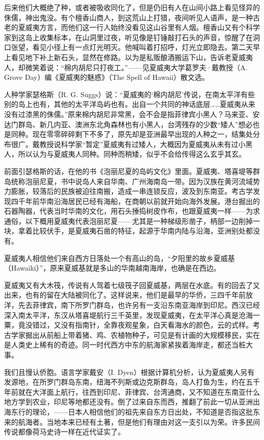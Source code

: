 \par 后来他们大概绝了种，或者被吸收同化了，但是仍旧有人在山间小路上看见怪异的侏儒，神出鬼没。有个檀香山商人，到这荒山上打猎，夜间听见人语声，是一种古老的夏威夷方言，而他们这一行人始终没看见这山谷里有人烟。檀香山又有个科学家到这岛上收集标本，在山洞里过夜，听见像是钉锤敲打石头的声音，惊醒了在洞口张望，看见小径上有一点灯光明灭。他喊叫着打招呼，灯光立即隐去。第二天早上看见地下补上新石头，显然在修路。以为是私贩酿酒搬运下山，告诉老夏威夷人，却微笑着说：“棉内胡尼只打夜工。”——见夏威夷大学葛罗夫·戴教授（A. Grove Day）编《夏威夷的魅惑》（The Spell of Hawaii）散文选。
\par 人种学家瑟格斯（R. G. Suggs）说：“夏威夷的‘棉内胡尼’传说，在南太平洋有些别的岛上也有，其他的太平洋岛屿也有。出自一个共同的神话底层……夏威夷从来没有过漆黑的侏儒。”原来棉内胡尼非常黑，会不会是指菲律宾小黑人？马来亚、安达门群岛、新几内亚、澳洲东北角森林也有小黑人，台湾残存的少数“矮人”想必也是同种。现在零零碎碎剩下不多了，原先却是亚洲最早出现的人种之一，结集处分布很广。戴教授说科学家“暂定”夏威夷有过矮人，大概因为夏威夷从未有过小黑人，所以认为与夏威夷人同种。同种而稍矮，似乎不会给传得这么玄乎其玄。
\par 前面引瑟格斯的话，在他的书《泡丽尼夏的岛屿文化》里面。夏威夷、塔喜堤等群岛统称泡丽尼夏，书中说岛人来自华南、广州海南岛一带。因为汉族在黄河流域势力膨胀，较落后的民族被迫往南搬，造成一串连锁反应，波及到东南亚。考古学发现四千年前华南沿海居民已经有海船，在商朝以前就开始向海外发展。港台掘出的石器陶器，代表当时华南的文化，用石头捶捣树皮作布，也跟夏威夷一样——为求通俗，以下概用夏威夷代表泡丽尼夏——尤其是一种梯级形凿子，柄部一边削掉一块，拿着比较伏手，是夏威夷石凿的特征，起源于华南内陆与沿海，亚洲别处都没有。
\par 夏威夷人相信他们来自西方日落处一个有高山的岛，“夕阳里的故乡夏威基（Hawaiki）”，原来夏威基就是多山的华南越南海岸，也确是在西边。
\par 夏威夷又有大木筏，传说有人驾着七级筏子回夏威基，两层在水底。有的回去了又出来，也有的留在大陆被同化了。这样说来，他们是最早的华侨，三四千年前放洋，先去菲律宾，南下所罗门群岛，也许另有一支沿东南亚海岸到印尼。西汉已经深入南太平洋，东汉从塔喜堤航行三千英里，发现夏威夷，在太平洋心真是沧海一粟，竟没错过，又没有指南针，全靠夜观星象，白天看海水的颜色，云的式样。考古学家掘出从前船上带着猪、鸡、农植物种子，可见是有计画的大规模移民，实在是人类史上稀有的奇迹。同一时代西方中东的航海家紧挨着海岸走，都还当桩大事。
\par 我们且慢认侨胞。语言学家戴安（I. Dyen）根据计算机分析，认为夏威夷人另有发源地，在所罗门群岛东南，纽海不列斯或边克斯群岛，岛人打鱼为生，约在五千年前就在大洋面上航行，往西到印尼、菲律宾、台湾通商，又不知道在东南亚什么地方学到农业，印尼等地都还没有。倒了过来自东而西，推翻了前此一切从亚洲出海东行的理论，——日本人相信他们的祖先来自东方日出处，不知道是否指这批东来的航海者。当地本来已经有土著，但是他们有理由对这一支引以为荣。许多民间传说都像荷马史诗一样在近代证实了。
